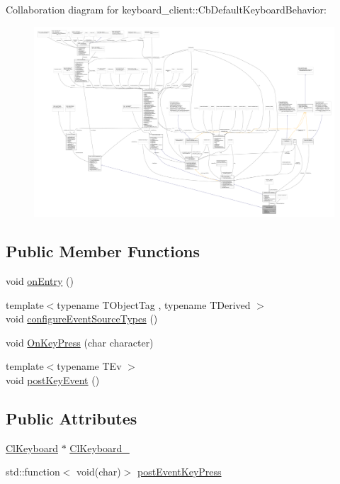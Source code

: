 Collaboration diagram for keyboard\+\_\+client\+:\+:Cb\+Default\+Keyboard\+Behavior\+:
\nopagebreak
\begin{figure}[H]
\begin{center}
\leavevmode
\includegraphics[width=350pt]{classkeyboard__client_1_1CbDefaultKeyboardBehavior__coll__graph}
\end{center}
\end{figure}
\subsection*{Public Member Functions}
\begin{DoxyCompactItemize}
\item 
void \hyperlink{classkeyboard__client_1_1CbDefaultKeyboardBehavior_a1ac673a9d9a733215f665810d6cf69aa}{on\+Entry} ()
\item 
{\footnotesize template$<$typename T\+Object\+Tag , typename T\+Derived $>$ }\\void \hyperlink{classkeyboard__client_1_1CbDefaultKeyboardBehavior_a70465c0886d118d226d136a4acc63ef3}{configure\+Event\+Source\+Types} ()
\item 
void \hyperlink{classkeyboard__client_1_1CbDefaultKeyboardBehavior_ae6b6fa6b648a503f2a55eccde8556daa}{On\+Key\+Press} (char character)
\item 
{\footnotesize template$<$typename T\+Ev $>$ }\\void \hyperlink{classkeyboard__client_1_1CbDefaultKeyboardBehavior_ae02c14e58b7348af59f3f82bfadbbbdd}{post\+Key\+Event} ()
\end{DoxyCompactItemize}
\subsection*{Public Attributes}
\begin{DoxyCompactItemize}
\item 
\hyperlink{classkeyboard__client_1_1ClKeyboard}{Cl\+Keyboard} $\ast$ \hyperlink{classkeyboard__client_1_1CbDefaultKeyboardBehavior_a17c088cabe2d686f227d2a6368629993}{Cl\+Keyboard\+\_\+}
\item 
std\+::function$<$ void(char)$>$ \hyperlink{classkeyboard__client_1_1CbDefaultKeyboardBehavior_ac3a5e8c2cca0fd4117ddc192858d3771}{post\+Event\+Key\+Press}
\end{DoxyCompactItemize}


